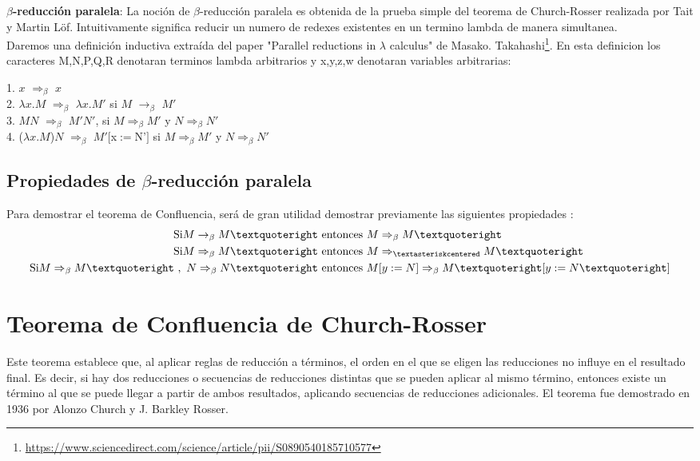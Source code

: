 \documentclass{article}
\begin{document}
\noindent\textbf{$\beta$-reducción paralela}:
La noción de $\beta$-reducción paralela es obtenida de la prueba simple del teorema de Church-Rosser realizada por Tait y Martin Löf. Intuitivamente significa reducir un numero de redexes existentes en un termino lambda de manera simultanea.\\
Daremos una definición inductiva extraída del paper "Parallel reductions in
$\lambda$ calculus" de Masako.  Takahashi\footnote{\url{https://www.sciencedirect.com/science/article/pii/S0890540185710577}}. En esta definicion los caracteres M,N,P,Q,R denotaran terminos lambda arbitrarios y x,y,z,w denotaran variables arbitrarias:

1. $x$ $\Rightarrow_{\beta}$  $x$\\

2. $\lambda x. M$  $\Rightarrow_{\beta}$ $\lambda x. M'$  si $M$ $\rightarrow_{\beta}$ $M'$\\

3. $M$$N$ $\Rightarrow_{\beta}$ $M'$$N'$, si $M$$\Rightarrow_{\beta}$$M'$ y $N$$\Rightarrow_{\beta}$$N'$ \\

4. ($\lambda x. M$)$N$ $\Rightarrow_{\beta}$ $M'[$x$ := $N'$]$ si $M$$\Rightarrow_{\beta}$$M'$ y $N$$\Rightarrow_{\beta}$$N'$ \\

\subsection{Propiedades de $\beta$-reducción paralela}
Para demostrar el teorema de Confluencia, será de gran utilidad demostrar previamente las siguientes propiedades :
\begin{align}
\text{Si}  M \rightarrow_{\beta} M’ \ &\text{entonces}\ M \Rightarrow_{\beta} M’ \\
\text{Si} M \Rightarrow_{\beta} M’ \ &\text{entonces}\ M \Rightarrow_{\textasteriskcentered} M’ \\
\text{Si} M \Rightarrow_{\beta} M’\ ,\ N \Rightarrow_{\beta} N’ \ &\text{entonces}\  M[y:=N] \Rightarrow_{\beta} M’[y:=N’]
\end{align}



\section{Teorema de Confluencia de Church-Rosser}

Este teorema establece que, al aplicar reglas de reducción a términos, el orden en el que se eligen las reducciones no influye en el resultado final. Es decir, si hay dos reducciones o secuencias de reducciones distintas que se pueden aplicar al mismo término, entonces existe un término al que se puede llegar a partir de ambos resultados, aplicando secuencias de reducciones adicionales. El teorema fue demostrado en 1936 por Alonzo Church y J. Barkley Rosser.
\end{document}
